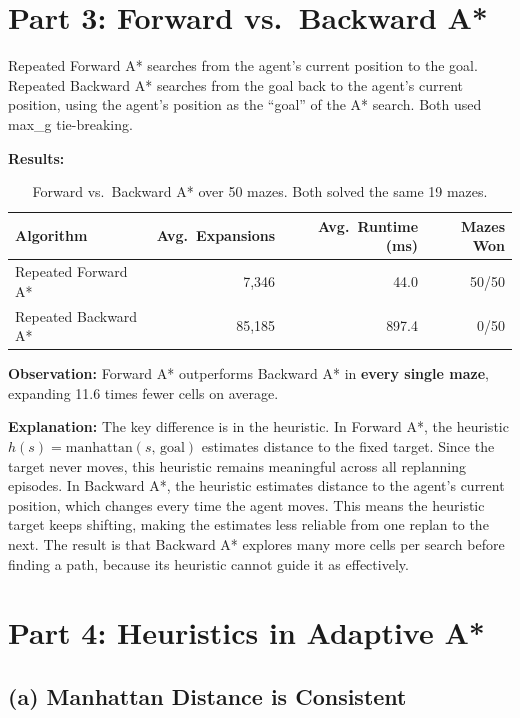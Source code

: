 \documentclass[12pt]{article}
\begin{document}
\section*{Part 3: Forward vs.\ Backward A*}

Repeated Forward A* searches from the agent's current position to the goal. Repeated Backward A* searches from the goal back to the agent's current position, using the agent's position as the ``goal'' of the A* search. Both used max\_g tie-breaking.

\textbf{Results:}

\begin{table}[H]
\centering
\begin{tabular}{lrrr}
\toprule
\textbf{Algorithm} & \textbf{Avg.\ Expansions} & \textbf{Avg.\ Runtime (ms)} & \textbf{Mazes Won} \\
\midrule
Repeated Forward A* & 7,346 & 44.0 & 50/50 \\
Repeated Backward A* & 85,185 & 897.4 & 0/50 \\
\bottomrule
\end{tabular}
\caption{Forward vs.\ Backward A* over 50 mazes. Both solved the same 19 mazes.}
\end{table}

\textbf{Observation:} Forward A* outperforms Backward A* in \textbf{every single maze}, expanding 11.6 times fewer cells on average.

\textbf{Explanation:} The key difference is in the heuristic. In Forward A*, the heuristic $h(s) = \text{manhattan}(s,\, \text{goal})$ estimates distance to the fixed target. Since the target never moves, this heuristic remains meaningful across all replanning episodes. In Backward A*, the heuristic estimates distance to the agent's current position, which changes every time the agent moves. This means the heuristic target keeps shifting, making the estimates less reliable from one replan to the next. The result is that Backward A* explores many more cells per search before finding a path, because its heuristic cannot guide it as effectively.

\section*{Part 4: Heuristics in Adaptive A*}

\subsection*{(a) Manhattan Distance is Consistent}
\end{document}
